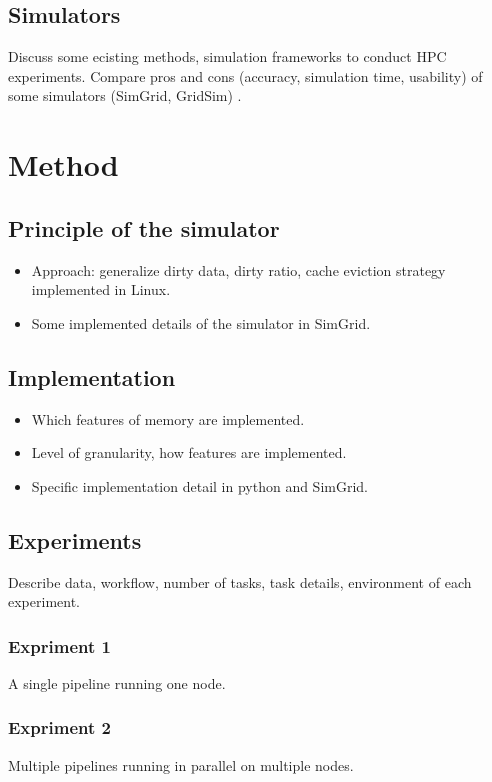 \documentclass[conference]{IEEEtran}
\begin{document}
		\subsection{Simulators}
		Discuss some ecisting methods, simulation frameworks to conduct HPC experiments. Compare pros and cons (accuracy, simulation time, usability) of some simulators (SimGrid, GridSim) .
			
	\section{Method}

		\subsection{Principle of the simulator}

			\begin{itemize}
				\item Approach: generalize dirty data, dirty ratio, cache eviction strategy implemented in Linux. 
				\item Some implemented details of the simulator in SimGrid.
			\end{itemize}

		\subsection{Implementation}
			\begin{itemize}
				\item Which features of memory are implemented.
				\item Level of granularity, how features are implemented.
				\item Specific implementation detail in python and SimGrid.
			\end{itemize}

		\subsection{Experiments}
			Describe data, workflow, number of tasks, task details, environment of each experiment.
	
			\subsubsection{Expriment 1}
				A single pipeline running one node.
			\subsubsection{Expriment 2}
				Multiple pipelines running in parallel on multiple nodes.
\end{document}
